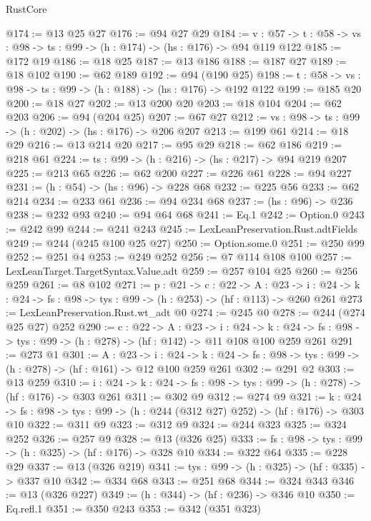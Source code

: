 \begin{lexlean}{RustCore}
\begin{coremodule}
@174 := @13 @25 @27
@176 := @94 @27 @29
@184 := {v : @57} ->
  {t : @58} -> {vs : @98} -> {ts : @99} -> (h : @174) -> (hs : @176) -> @94 @119 @122
@185 := @172 @19
@186 := @18 @25
@187 := @13 @186
@188 := @187 @27
@189 := @18 @102
@190 := @62 @189
@192 := @94 (@190 @25)
@198 := {t : @58} -> {vs : @98} -> {ts : @99} -> (h : @188) -> (hs : @176) -> @192 @122
@199 := @185 @20
@200 := @18 @27
@202 := @13 @200 @20
@203 := @18 @104
@204 := @62 @203
@206 := @94 (@204 @25)
@207 := @67 @27
@212 := {vs : @98} -> {ts : @99} -> (h : @202) -> (hs : @176) -> @206 @207
@213 := @199 @61
@214 := @18 @29
@216 := @13 @214 @20
@217 := @95 @29
@218 := @62 @186
@219 := @218 @61
@224 := {ts : @99} -> (h : @216) -> (hs : @217) -> @94 @219 @207
@225 := @213 @65
@226 := @62 @200
@227 := @226 @61
@228 := @94 @227
@231 := (h : @54) -> (hs : @96) -> @228 @68
@232 := @225 @56
@233 := @62 @214
@234 := @233 @61
@236 := @94 @234 @68
@237 := (hs : @96) -> @236
@238 := @232 @93
@240 := @94 @64 @68
@241 := Eq.{1}
@242 := Option.{0}
@243 := @242 @99
@244 := @241 @243
@245 := LexLeanPreservation.Rust.adtFields
@249 := @244 (@245 @100 @25 @27)
@250 := Option.some.{0}
@251 := @250 @99
@252 := @251 @4
@253 := @249 @252
@256 := @7 @114 @108 @100
@257 := LexLeanTarget.TargetSyntax.Value.adt
@259 := @257 @104 @25
@260 := @256 @259
@261 := @8 @102
@271 := {p : @21} ->
  {c : @22} ->
  {A : @23} ->
  {i : @24} -> {k : @24} -> {fs : @98} -> {tys : @99} -> (h : @253) -> (hf : @113) -> @260 @261
@273 := LexLeanPreservation.Rust.wt_adt @0
@274 := @245 @0
@278 := @244 (@274 @25 @27) @252
@290 := {c : @22} ->
  {A : @23} ->
  {i : @24} ->
  {k : @24} -> {fs : @98} -> {tys : @99} -> (h : @278) -> (hf : @142) -> @11 @108 @100 @259 @261
@291 := @273 @1
@301 := {A : @23} ->
  {i : @24} ->
  {k : @24} -> {fs : @98} -> {tys : @99} -> (h : @278) -> (hf : @161) -> @12 @100 @259 @261
@302 := @291 @2
@303 := @13 @259
@310 := {i : @24} ->
  {k : @24} -> {fs : @98} -> {tys : @99} -> (h : @278) -> (hf : @176) -> @303 @261
@311 := @302 @9
@312 := @274 @9
@321 := {k : @24} ->
  {fs : @98} -> {tys : @99} -> (h : @244 (@312 @27) @252) -> (hf : @176) -> @303 @10
@322 := @311 @9
@323 := @312 @9
@324 := @244 @323
@325 := @324 @252
@326 := @257 @9
@328 := @13 (@326 @25)
@333 := {fs : @98} -> {tys : @99} -> (h : @325) -> (hf : @176) -> @328 @10
@334 := @322 @64
@335 := @228 @29
@337 := @13 (@326 @219)
@341 := {tys : @99} -> (h : @325) -> (hf : @335) -> @337 @10
@342 := @334 @68
@343 := @251 @68
@344 := @324 @343
@346 := @13 (@326 @227)
@349 := (h : @344) -> (hf : @236) -> @346 @10
@350 := Eq.refl.{1}
@351 := @350 @243
@353 := @342 (@351 @323)

\end{coremodule}
\end{lexlean}
